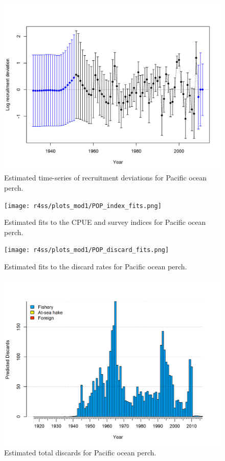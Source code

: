\documentclass[12pt,]{article}
\begin{document}
\begin{figure}
\centering
\includegraphics{r4ss/plots_mod1/recdevs2_withbars.png}
\caption{Estimated time-series of recruitment deviations for Pacific
ocean perch. \label{fig:recdevs}}
\end{figure}

\FloatBarrier

\begin{figure}
\centering
\texttt{[image: r4ss/plots\_mod1/POP\_index\_fits.png]}
\caption{Estimated fits to the CPUE and survey indices for Pacific ocean
perch. \label{fig:index_fits}}
\end{figure}

\FloatBarrier 

\begin{figure}
\centering
\texttt{[image: r4ss/plots\_mod1/POP\_discard\_fits.png]}
\caption{Estimated fits to the discard rates for Pacific ocean perch.
\label{fig:discard_fits}}
\end{figure}

\FloatBarrier 

\begin{figure}
\centering
\includegraphics{r4ss/plots_mod1/catch7 discards stacked plot (depends on multiple fleets).png}
\caption{Estimated total discards for Pacific ocean perch.
\label{fig:total_discard}}
\end{figure}
\end{document}
